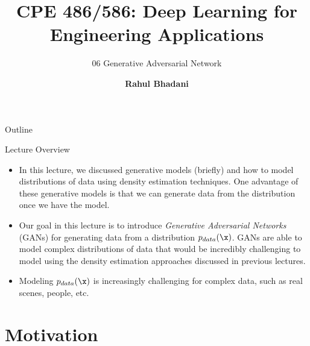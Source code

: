\documentclass[aspectratio=169,xcolor=dvipsnames,svgnames,x11names,fleqn]{beamer}
\title[CPE 487/587: Deep Learning]{CPE 486/586: Deep Learning for Engineering Applications} %
\subtitle{06 Generative Adversarial Network}
\author[Rahul Bhadani] {{\Large \textbf{Rahul Bhadani}}}
\institute[UAH] %
{
    Electrical \& Computer Engineering,  The University of Alabama in Huntsville
}
\date
\begin{document}
\begin{frame}
    \titlepage
\end{frame}

\begin{frame}{Outline}
    \backgroundtableofcontents
\end{frame}
    

\begin{frame}{Lecture Overview}
    \begin{itemize}
        \item In this lecture, we discussed generative models (briefly) and how to model distributions of data using density estimation techniques. One advantage of these generative models is that we can generate data from the distribution once we have the model.   
        \item Our goal in this lecture is to introduce {\em \color{MediumRed}Generative Adversarial Networks} (GANs) for generating data from a distribution $p_{data}(\x)$. GANs are able to model complex distributions of data that would be incredibly challenging to model using the density estimation approaches discussed in previous lectures. 
        \item Modeling $p_{data}(\x)$ is increasingly challenging for complex data, such as real scenes, people, etc. 
    \end{itemize}
\end{frame}


\section{Motivation}

\begin{frame}
    \sectionpage
\end{frame}
\end{document}
